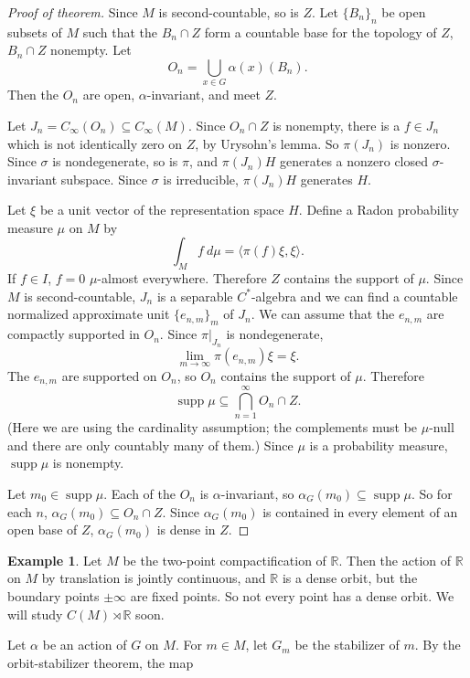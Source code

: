 \documentclass[12pt]{report}
\newcommand{\RR}{\mathbb{R}}
\newcommand{\supp}{\operatorname{supp}}
\theoremstyle{definition}
\newtheorem{example}[theorem]{Example}
\begin{document}
\begin{proof}[Proof of theorem]
    Since $M$ is second-countable, so is $Z$. Let $\{B_n\}_n$ be open subsets of $M$ such that the $B_n \cap Z$ form a countable base for the topology of $Z$, $B_n \cap Z$ nonempty. Let
    $$O_n = \bigcup_{x \in G} \alpha(x)(B_n).$$
    Then the $O_n$ are open, $\alpha$-invariant, and meet $Z$.

    Let $J_n = C_\infty(O_n) \subseteq C_\infty(M)$. Since $O_n \cap Z$ is nonempty, there is a $f \in J_n$ which is not identically zero on $Z$, by Urysohn's lemma. So $\pi(J_n)$ is nonzero. Since $\sigma$ is nondegenerate, so is $\pi$, and $\pi(J_n)H$ generates a nonzero closed $\sigma$-invariant subspace. Since $\sigma$ is irreducible, $\pi(J_n)H$ generates $H$.

    Let $\xi$ be a unit vector of the representation space $H$. Define a Radon probability measure $\mu$ on $M$ by
    $$\int_M f~d\mu = \langle \pi(f)\xi, \xi\rangle.$$
    If $f \in I$, $f = 0$ $\mu$-almost everywhere. Therefore $Z$ contains the support of $\mu$. Since $M$ is second-countable, $J_n$ is a separable $C^*$-algebra and we can find a countable normalized approximate unit $\{e_{n,m}\}_m$ of $J_n$. We can assume that the $e_{n,m}$ are compactly supported in $O_n$. Since $\pi|_{J_n}$ is nondegenerate,
    $$\lim_{m \to \infty} \pi(e_{n,m})\xi = \xi.$$
    The $e_{n,m}$ are supported on $O_n$, so $O_n$ contains the support of $\mu$. Therefore
    $$\supp \mu \subseteq \bigcap_{n=1}^\infty O_n \cap Z.$$
    (Here we are using the cardinality assumption; the complements must be $\mu$-null and there are only countably many of them.)
    Since $\mu$ is a probability measure, $\supp \mu$ is nonempty.

    Let $m_0 \in \supp \mu$. Each of the $O_n$ is $\alpha$-invariant, so $\alpha_G(m_0) \subseteq \supp \mu$. So for each $n$, $\alpha_G(m_0) \subseteq O_n \cap Z$. Since $\alpha_G(m_0)$ is contained in every element of an open base of $Z$, $\alpha_G(m_0)$ is dense in $Z$.
\end{proof}
\begin{example}
    Let $M$ be the two-point compactification of $\RR$. Then the action of $\RR$ on $M$ by translation is jointly continuous, and $\RR$ is a dense orbit, but the boundary points $\pm \infty$ are fixed points. So not every point has a dense orbit. We will study $C(M) \rtimes \RR$ soon.
\end{example}
    Let $\alpha$ be an action of $G$ on $M$. For $m \in M$, let $G_m$ be the stabilizer of $m$. By the orbit-stabilizer theorem, the map
\end{document}
